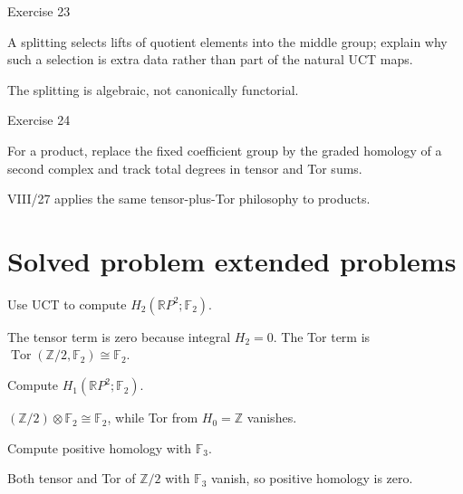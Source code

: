 \begin{exercise}\label{exr:viii26-23}
Exercise 23
\end{exercise}
\begin{hint}
A splitting selects lifts of quotient elements into the middle group; explain why such a selection is extra data rather than part of the natural UCT maps.
\end{hint}
\begin{solution}
The splitting is algebraic, not canonically functorial.
\end{solution}

\begin{exercise}\label{exr:viii26-24}
Exercise 24
\end{exercise}
\begin{hint}
For a product, replace the fixed coefficient group by the graded homology of a second complex and track total degrees in tensor and Tor sums.
\end{hint}
\begin{solution}
VIII/27 applies the same tensor-plus-Tor philosophy to products.
\end{solution}


\section{Solved problem extended problems}

\begin{problem}[RP2 H2 mod2]\label{prob:viii26-01}
Use UCT to compute \(H_2(\mathbb RP^2;\mathbb F_2)\).
\end{problem}
\begin{solution}
The tensor term is zero because integral \(H_2=0\). The Tor term is \(\operatorname{Tor}(\mathbb Z/2,\mathbb F_2)\cong\mathbb F_2\).
\end{solution}

\begin{problem}[RP2 H1 mod2]\label{prob:viii26-02}
Compute \(H_1(\mathbb RP^2;\mathbb F_2)\).
\end{problem}
\begin{solution}
\((\mathbb Z/2)\otimes\mathbb F_2\cong\mathbb F_2\), while Tor from \(H_0=\mathbb Z\) vanishes.
\end{solution}

\begin{problem}[RP2 mod3]\label{prob:viii26-03}
Compute positive homology with \(\mathbb F_3\).
\end{problem}
\begin{solution}
Both tensor and Tor of \(\mathbb Z/2\) with \(\mathbb F_3\) vanish, so positive homology is zero.
\end{solution}

